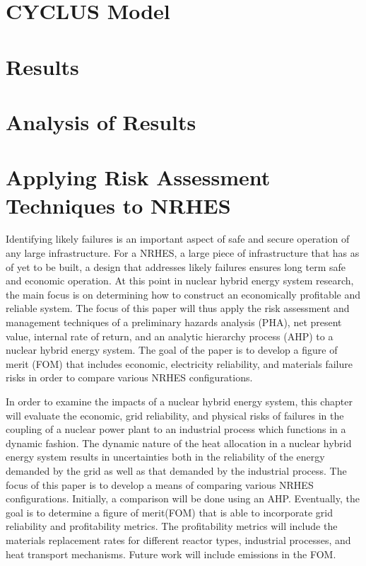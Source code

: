 \documentclass[12pt]{UIdahoMastersThesis}
\begin{document}
\chapter{CYCLUS Model}

\chapter{Results}

\chapter{Analysis of Results}

\chapter{Applying Risk Assessment Techniques to NRHES}

Identifying likely failures is an important aspect of safe and secure operation of any large infrastructure. For a NRHES, a large piece of infrastructure that has as of yet to be built, a design that addresses likely failures ensures long term safe and economic operation.  At this point in nuclear hybrid energy system research, the main focus is on determining how to construct an economically profitable and reliable system.  The focus of this paper will thus apply the risk assessment and management techniques of a preliminary hazards analysis (PHA), net present value, internal rate of return, and an analytic hierarchy process (AHP) to a nuclear hybrid energy system.  The goal of the paper is to develop a figure of merit (FOM) that includes economic, electricity reliability, and materials failure risks in order to compare various NRHES configurations.

In order to examine the impacts of a nuclear hybrid energy system, this chapter will evaluate the economic, grid reliability, and physical risks of failures in the coupling of a nuclear power plant to an industrial process which functions in a dynamic fashion. The dynamic nature of the heat allocation in a nuclear hybrid energy system results in uncertainties both in the reliability of the energy demanded by the grid as well as that demanded by the industrial process. The focus of this paper is to develop a means of comparing various NRHES configurations. Initially, a comparison will be done using an AHP.  Eventually, the goal is to determine a figure of merit(FOM) that is able to incorporate grid reliability and profitability metrics.  The profitability metrics will include the materials replacement rates for different reactor types, industrial processes, and heat transport mechanisms. Future work will include emissions in the FOM.
\end{document}
